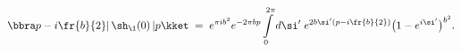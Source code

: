 \begin{equation}\label{int}
\bbra p-i\fr{b}{2}|\,\sh_\1(0)\,|p\kket\;=\;e^{\pi i b^2}
e^{-2\pi bp}
\int\limits_0^{2\pi}d\si'\; e^{2b\si'(p-i\fr{b}{2})}
\big(1-e^{i\si'}\big)^{b^2}.
\end{equation}

